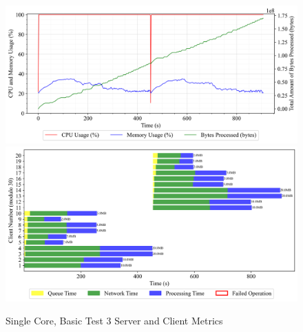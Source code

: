 \newpage
\begin{figure}[h!t]
    \begin{center}
    \label{Fig:A1.3}
    \caption{Single Core, Basic Test 3 Server and Client Metrics}
    \includegraphics[width=\xLarge\textwidth]{Chapter4/Results/1c_results/arty-a7-1c_basic_3_20241004_112455.db_server_metrics.png}
    \includegraphics[width=\xLarge\textwidth]{Chapter4/Results/1c_results/arty-a7-1c_basic_3_20241004_112455.db_client_tasks.png}
    \end{center}
\end{figure}

